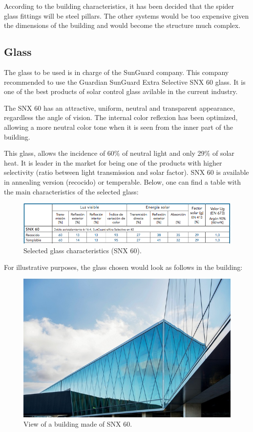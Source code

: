 According to the building characteristics, it has been decided that the spider glass fittings will be steel pillars. The other systems would be too expensive given the dimensions of the building and would become the structure much complex.



		\subsection{Glass}
	The glass to be used is in charge of the SunGuard company. This company recommended to use the Guardian SunGuard Extra Selective SNX 60 glass. It is one of the best products of solar control glass avilable in the current industry.
	
	The SNX 60 has an attractive, uniform, neutral and transparent appearance, regardless the angle of vision. The internal color reflexion has been optimized, allowing a more neutral color tone when it is seen from the inner part of the building. 
	
	This glass, allows the incidence of 60\% of neutral light and only 29\% of solar heat. It is leader in the market for being one of the products with higher selectivity (ratio between light transmission and solar factor). SNX 60 is available in annealing version (recocido) or temperable. Below, one can find a table with the main characteristics of the selected glass:
	
\begin{figure}[ht!]
\centering
\includegraphics[width=15cm]{./images/Facade/performances}
\caption{Selected glass characteristics (SNX 60).}
\end{figure}

For illustrative purposes, the glass chosen would look as follows in the building:

\begin{figure}[ht!]
\centering
\includegraphics[width=13cm]{./images/Facade/snx60}
\caption{View of a building made of SNX 60.}
\end{figure}

